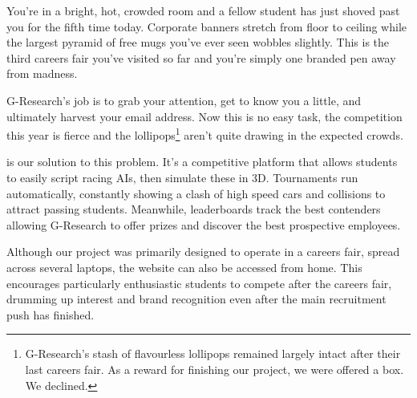 You're in a bright, hot, crowded room and a fellow student has just shoved past you for the fifth time today. Corporate banners stretch from floor to ceiling while the largest pyramid of free mugs you've ever seen wobbles slightly. This is the third careers fair you've visited so far and you're simply one branded pen away from madness.

G-Research's job is to grab your attention, get to know you a little, and ultimately harvest your email address. Now this is no easy task, the competition this year is fierce and the lollipops\footnote{G-Research's stash of flavourless lollipops remained largely intact after their last careers fair. As a reward for finishing our project, we were offered a box. We declined.} aren't quite drawing in the expected crowds.

\project is our solution to this problem. It's a competitive platform that allows students to easily script racing AIs, then simulate these in 3D. Tournaments run automatically, constantly showing a clash of high speed cars and collisions to attract passing students. Meanwhile, leaderboards track the best contenders allowing G-Research to offer prizes and discover the best prospective employees. 

Although our project was primarily designed to operate in a careers fair, spread across several laptops, the website can also be accessed from home. This encourages particularly enthusiastic students to compete after the careers fair, drumming up interest and brand recognition even after the main recruitment push has finished.
